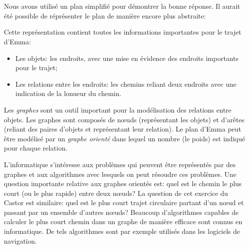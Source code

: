 {{%
\section*{\BrochureItsInformatics}
Nous avons utilisé un plan simplifié pour démontrer la bonne réponse. Il aurait été possible de réprésenter le plan de manière encore plus abstraite:

{\centering%
\par}

Cette représentation contient toutes les informations importantes pour le trajet d’Emma:

\begin{itemize}
  \item Les objets: les endroits, avec une mise en évidence des endroits importants pour le trajet;
  \item Les relations entre les endroits: les chemins reliant deux endroits avec une indication de la lonueur du chemin.
\end{itemize}

Les \emph{graphes} sont un outil important pour la modélisation des relations entre objets. Les graphes sont composés de nœuds (représentant les objets) et d’arêtes (reliant des paires d’objets et représentant leur relation). Le plan d’Emma peut être modélisé par un \emph{graphe orienté} dans lequel un nombre (le poids) est indiqué pour chaque relation.

L’informatique s’intéresse aux problèmes qui peuvent être représentés par des graphes et aux algorithmes avec lesquels on peut résoudre ces problèmes. Une question importante relative aux graphes orientés est: quel est le chemin le plus court (ou le plus rapide) entre deux nœuds? La question de cet exercice du Castor est similaire: quel est le plus court trajet circulaire partant d’un nœud et passant par un ensemble d’autres nœuds? Beaucoup d’algorithmes capables de calculer le plus court chemin dans un graphe de manière efficace sont connus en informatique. De tels algorithmes sont par exemple utilisés dans les logiciels de navigation.



}}
